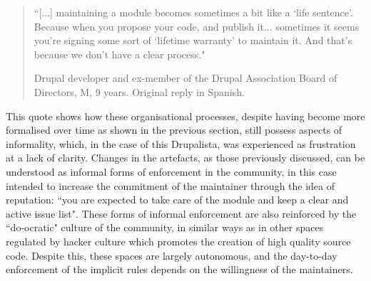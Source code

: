 \begin{quotation}
``[...] maintaining a module becomes sometimes a bit like a `life sentence'. Because when you propose your code, and publish it... sometimes it seems you're signing some sort of `lifetime warranty' to maintain it. And that's because we don't have a clear process."

\begin{flushright}\footnotesize{Drupal developer and ex-member of the Drupal Association Board of Directors, M, 9 years. Original reply in Spanish.}\end{flushright}
\end{quotation}

This quote shows how these organisational processes, despite having become more formalised over time as shown in the previous section, still possess aspects of informality, which, in the case of this Drupalista, was experienced as frustration at a lack of clarity. Changes in the artefacts, as those previously discussed, can be understood as informal forms of enforcement in the community, in this case intended to increase the commitment of the maintainer through the idea of reputation: ``you are expected to take care of the module and keep a clear and active issue list". These forms of informal enforcement are also reinforced by the ``do-ocratic" culture of the community, in similar ways as in other spaces regulated by hacker culture \parencite{levy1984hackers, coleman2013coding} which promotes the creation of high quality source code. Despite this, these spaces are largely autonomous, and the day-to-day enforcement of the implicit rules depends on the willingness of the maintainers.

